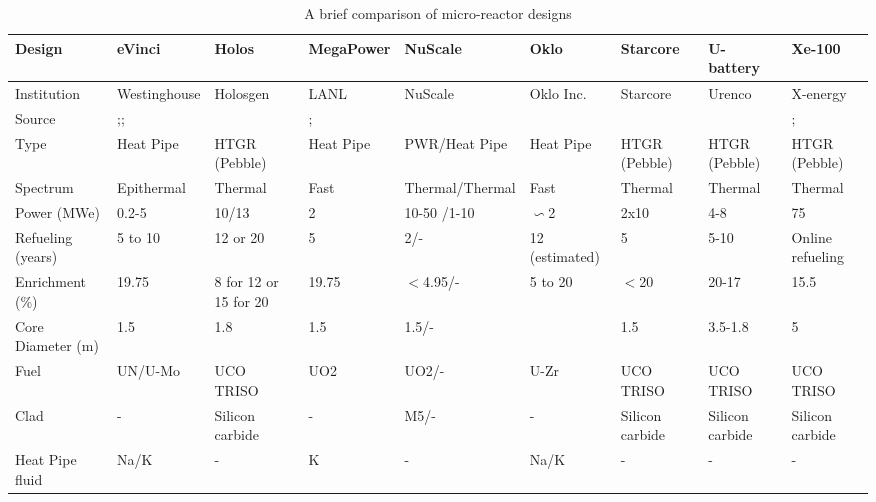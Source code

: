 \documentclass[10pt,a4paper]{article}
\begin{document}
\pagebreak
{}
\begin{landscape}
\begin{table} [ht]
\begin{center}

\caption{A brief comparison of micro-reactor designs}
\label{microreactors}
\begin{tabular}{|l|l|l|l|l|l|l|l|l|}
\hline 
Design 		&eVinci 		& Holos		&MegaPower 	& NuScale		& Oklo 		& Starcore		& U-battery 		& Xe-100 \\ 
\hline 
Institution 	&Westinghouse& Holosgen	&LANL	& NuScale		& Oklo Inc. 	& Starcore		& Urenco 		& X-energy \\ 
Source 	&\cite{Levinsky18};\cite{Yan20};\cite{Arafat19}  &\cite{holos17}  	& \cite{mega15};\cite{mega17}	& \cite{NuChapter4} 		& \cite{Oklofsar} 	&\cite{starwebsite} 		&\cite{Ubattery}  		&\cite{IAEA18};\cite{xmeeting} \\ 
Type			&Heat Pipe	& HTGR (Pebble)	  	& Heat Pipe 		& PWR/Heat Pipe&Heat Pipe   			&	HTGR (Pebble)			& HTGR (Pebble)	& HTGR (Pebble)\\ 
Spectrum		&Epithermal	& Thermal 		 	&Fast  	&Thermal/Thermal 		&Fast   			& Thermal  			&	Thermal		&Thermal\\ 
Power (MWe)	&0.2-5		& 10/13  			&2			& 10-50 /1-10			& $\backsim$2  			&2x10  			&4-8			&75\\ 
Refueling (years)&5 to 10		&12 or 20   			&	5		& 2/- 			& 12 (estimated)  			&5  			&5-10 			&Online refueling\\ 
Enrichment (\%)&19.75		&8 for 12 or 15 for 20   			&19.75			& $<$4.95/- 		&  5 to 20 			&$<$20	  			&20-17			&15.5\\ 
Core  Diameter (m)	&1.5		& 1.8  			&1.5			& 1.5/- 		&   			&1.5   			&3.5-1.8			& 5\\ 
Fuel			&UN/U-Mo	& UCO TRISO  			&	UO2		&UO2/-		&  U-Zr 			& UCO TRISO  			&UCO TRISO			&UCO TRISO\\ 
Clad			&-		&  Silicon carbide 			&	-		& M5/- 		&   -			&Silicon carbide   			&Silicon carbide			&Silicon carbide\\ 
Heat Pipe fluid	&Na/K	& -  			&K			& - 		& Na/K 			&  - 			&	-		&-\\ 
\hline
\end{tabular}


\end{center}
\end{table}
\end{landscape}
\end{document}
